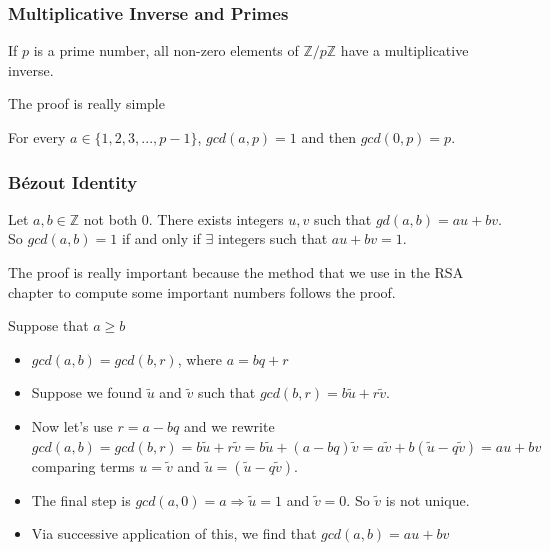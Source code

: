 \documentclass{article}
\begin{document}
\subsubsection{Multiplicative Inverse and Primes}
\begin{tcolorbox}[sharp corners, colback=green!30, colframe=green!80!blue, title=Existence of Multiplicative Inverse]
If $ p $ is a prime number, all non-zero elements of $ \mathbb{Z}/p\mathbb{Z} $ have a multiplicative inverse.
\end{tcolorbox}
The proof is really simple
\begin{tcolorbox}
For every $ a \in \{1,2,3,...,p-1\} $, $ gcd(a,p) = 1 $ and then $ gcd(0,p) = p $.
\end{tcolorbox}

\subsubsection{Bézout Identity} 
\begin{tcolorbox}[sharp corners, colback=green!30, colframe=green!80!blue, title=Bézout Identity]
Let $ a, b \in \mathbb{Z} $ not both 0. There exists integers $ u, v $ such that $ gd(a, b) = au + bv $. So $ gcd(a, b) = 1 $ if and only if $ \exists $ integers such that $ au + bv = 1 $.
\end{tcolorbox}
The proof is really important because the method that we use in the RSA chapter to compute some important numbers follows the proof.

\begin{tcolorbox}
Suppose that $ a \geq b $
\begin{itemize}
\item $ gcd(a,b) = gcd(b,r) $, where $ a = bq + r $
\item Suppose we found $ \tilde{u} $ and $ \tilde{v} $ such that $ gcd(b,r) = b \tilde{u} + r\tilde{v} $.
\item Now let's use $ r = a - bq $ and we rewrite $ gcd(a,b) = gcd(b,r) = b\tilde{u} + r\tilde{v} = b\tilde{u} + (a - bq)\tilde{v} = a\tilde{v} + b(\tilde{u} - q\tilde{v}) = au + bv $ comparing terms $ u = \tilde{v} $ and $ \tilde{u} = (\tilde{u} - q\tilde{v}) $.
\item The final step is $ gcd(a,0) = a \Rightarrow \tilde{u} = 1 $ and $ \tilde{v} = 0 $. So $ \tilde{v} $ is not unique.
\item Via successive application of this, we find that $ gcd(a,b) = au + bv $
\end{itemize}
\end{tcolorbox}
\end{document}
